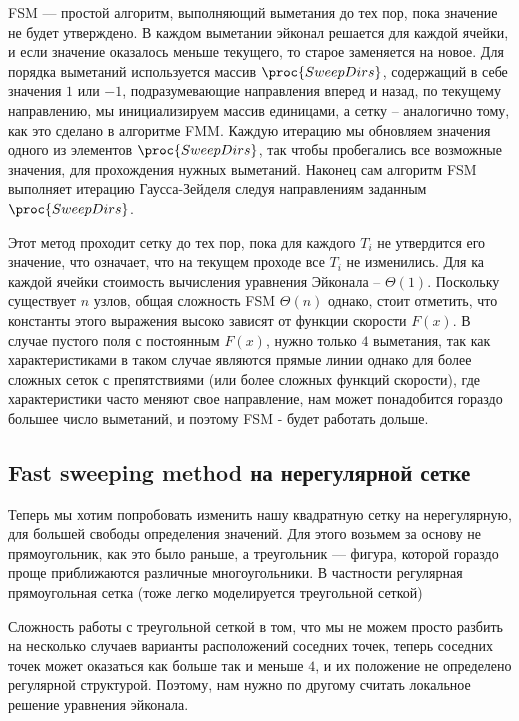 FSM --- простой алгоритм, выполняющий выметания до тех пор, пока
значение не будет утверждено. В каждом выметании эйконал решается для
каждой ячейки, и если значение оказалось меньше текущего, то старое
заменяется на новое. Для порядка выметаний используется массив
$\proc{SweepDirs}$, содержащий в себе значения $1$ или $-1$,
подразумевающие направления вперед и назад, по текущему направлению,
мы инициализируем массив единицами, а сетку -- аналогично тому, как
это сделано в алгоритме FMM. Каждую итерацию мы обновляем значения
одного из элементов $\proc{SweepDirs}$, так чтобы пробегались все
возможные значения, для прохождения нужных выметаний. Наконец сам
алгоритм FSM выполняет итерацию Гаусса-Зейделя следуя направлениям
заданным $\proc{SweepDirs}$.

Этот метод проходит сетку до тех пор, пока для каждого $T_i$ не
утвердится его значение, что означает, что на текущем проходе все $T_i$ не
изменились. Для ка каждой ячейки стоимость вычисления уравнения
Эйконала -- $\Theta(1)$. Поскольку существует $n$ узлов, общая
сложность FSM $\Theta(n)$ однако, стоит отметить, что константы этого
выражения высоко зависят от функции скорости $F(x)$. В случае пустого
поля с постоянным $F(x)$, нужно только $4$ выметания, так как
характеристиками в таком случае являются прямые линии однако для более
сложных сеток с препятствиями (или более сложных функций скорости),
где характеристики часто меняют свое направление, нам может
понадобится гораздо большее число выметаний, и поэтому FSM - будет
работать дольше.

\subsection{Fast sweeping method на нерегулярной сетке}
\label{sec:unstructured-mesh}

Теперь мы хотим попробовать изменить нашу квадратную сетку на
нерегулярную, для большей свободы определения значений. Для этого
возьмем за основу не прямоугольник, как это было раньше, а треугольник
--- фигура, которой гораздо проще приближаются различные
многоугольники. В частности регулярная прямоугольная сетка (тоже легко
моделируется треугольной сеткой)

Сложность работы с треугольной сеткой в том, что мы не можем просто
разбить на несколько случаев варианты расположений соседних точек,
теперь соседних точек может оказаться как больше так и меньше $4$, и
их положение не определено регулярной структурой. Поэтому, нам нужно
по другому считать локальное решение уравнения эйконала.

